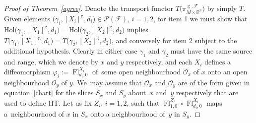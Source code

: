 \documentclass[10pt,a4paper]{amsart}
\numberwithin{equation}{section}
\def\g{\operatorname{g}}
\def\Fl{\operatorname{Fl}}
\def\FF{{\mathcal{F}}}
\def\PP{{\mathcal{P}}}
\def\OO{{\mathcal{O}}}
\def\RB{{\mathbb{R}}}
\begin{document}
\begin{proof}[Proof of Theorem~\ref{agree}]
Denote the transport functor $T\big(\pi_{M\times\RB^{n}}^{\g,\FF}\big)$ by simply $T$. Given ele\-ments $\big(\gamma_{i},[X_{i}]^{\g},d_{i}\big)\in\PP(\FF)$, $i = 1,2$, for item 1 we must show that $\text{Hol}\big(\gamma_{1},[X_{1}]^{\g},d_{1}\big) = \text{Hol}\big(\gamma_{2},[X_{2}]^{\g},d_{2}\big)$ implies $T\big(\gamma_{1},[X_{1}]^{\g},d_{1}\big) = T\big(\gamma_{2},[X_{2}]^{\g},d_{2}\big)$, and conversely for item 2 subject to the additional hypothesis. Clearly in either case $\gamma_{1}$ and $\gamma_{2}$ must have the same source and range, which we denote by $x$ and $y$ respectively, and each $X_{i}$ defines a diffeomorphism $\varphi_{i}:=\Fl^{X_{i}}_{d_{i},0}$ of~some open neighbourhood $\OO_{x}$ of $x$ onto an open neighbourhood $\OO_{y}$ of $y$. We~may assume that $\OO_{x}$ and $\OO_{y}$ are of the form given in equation~\eqref{chart} for the slices $S_{x}$ and $S_{y}$ about~$x$ and~$y$ respectively that are used to define HT. Let us fix $Z_{i}$, $i=1,2$, such that $\Fl^{Z_{i}}_{1,0}\circ\Fl^{X_{i}}_{d_{i},0}$ maps a~neighbourhood of $x$ in $S_{x}$ onto a neighbourhood of~$y$ in $S_{y}$.


\end{proof}
\end{document}
